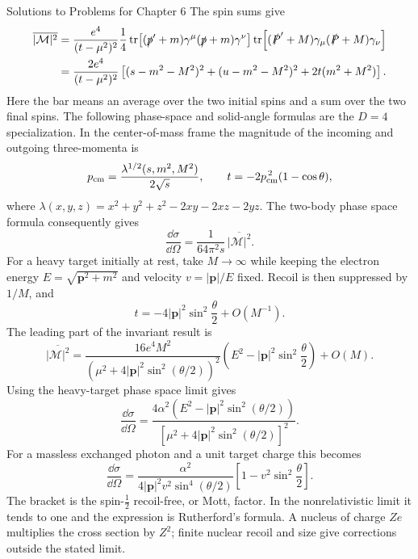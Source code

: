 \begin{bankssolutions}{Solutions to Problems for Chapter 6}
The spin sums give
\begin{align*}
 \overline{|\mathcal M|^2}
 &=\frac{e^4}{(t-\mu^2)^2}\frac14
 \operatorname{tr}\!\left[(\slashed p'+m)\gamma^\mu
 (\slashed p+m)\gamma^\nu\right]
 \operatorname{tr}\!\left[(\slashed P'+M)\gamma_\mu
 (\slashed P+M)\gamma_\nu\right]\\
 &=\frac{2e^4}{(t-\mu^2)^2}
 \left[(s-m^2-M^2)^2+(u-m^2-M^2)^2
 +2t(m^2+M^2)\right].
\end{align*}
Here the bar means an average over the two initial spins and a sum over the
two final spins.  The following phase-space and solid-angle formulas are the
\(D=4\) specialization.  In the center-of-mass frame the magnitude of the incoming
and outgoing three-momenta is
\[
 p_{\rm cm}=\frac{\lambda^{1/2}(s,m^2,M^2)}{2\sqrt{s}},
 \qquad
 t=-2p_{\rm cm}^{\,2}(1-\cos\theta),
\]
where $\lambda(x,y,z)=x^2+y^2+z^2-2xy-2xz-2yz$.  The two-body phase
space formula consequently gives
\begin{equation*}
 \frac{\dd\sigma}{\dd\Omega}
 =\frac{1}{64\pi^2s}\,\overline{|\mathcal M|^2}.
\end{equation*}
For a heavy target initially at rest, take $M\to\infty$ while keeping the
electron energy $E=\sqrt{\mathbf p^2+m^2}$ and velocity
$v=|\mathbf p|/E$ fixed.  Recoil is then suppressed by $1/M$, and
\[
 t=-4|\mathbf p|^2\sin^2\frac\theta2+O(M^{-1}).
\]
The leading part of the invariant result is
\[
 \overline{|\mathcal M|^2}
 =\frac{16e^4M^2}{(\mu^2+4|\mathbf p|^2\sin^2(\theta/2))^2}
 \left(E^2-|\mathbf p|^2\sin^2\frac\theta2\right)+O(M).
\]
Using the heavy-target phase space limit gives
\begin{equation*}
 \frac{\dd\sigma}{\dd\Omega}
 =\frac{4\alpha^2
 \left(E^2-|\mathbf p|^2\sin^2(\theta/2)\right)}
 {\left[\mu^2+4|\mathbf p|^2\sin^2(\theta/2)\right]^2}.
\end{equation*}
For a massless exchanged photon and a unit target charge this becomes
\begin{equation*}
 \frac{\dd\sigma}{\dd\Omega}
 =\frac{\alpha^2}{4|\mathbf p|^2v^2\sin^4(\theta/2)}
 \left[1-v^2\sin^2\frac\theta2\right].
\end{equation*}
The bracket is the spin-$\frac12$ recoil-free, or Mott, factor.  In the
nonrelativistic limit it tends to one and the expression is Rutherford's
formula.  A nucleus of charge $Z e$ multiplies the cross section by $Z^2$;
finite nuclear recoil and size give corrections outside the stated limit.


\end{bankssolutions}
